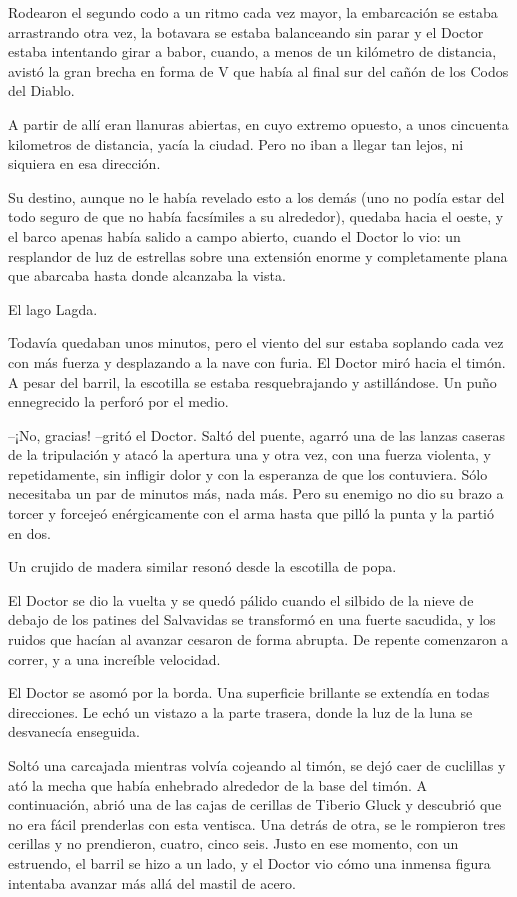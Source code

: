 Rodearon el segundo codo a un ritmo cada vez mayor, la embarcación se estaba arrastrando otra vez, la botavara se estaba balanceando sin parar y el Doctor estaba intentando girar a babor, cuando, a menos de un kilómetro de distancia, avistó la gran brecha en forma de V que había al final sur del cañón de los Codos del Diablo.
 
A partir de allí eran llanuras abiertas, en cuyo extremo opuesto, a unos cincuenta kilometros de distancia, yacía la ciudad. Pero no iban a llegar tan lejos, ni siquiera en esa dirección.
 
Su destino, aunque no le había revelado esto a los demás (uno no podía estar del todo seguro de que no había facsímiles a su alrededor), quedaba hacia el oeste, y el barco apenas había salido a campo abierto, cuando el Doctor lo vio: un resplandor de luz de estrellas sobre una extensión enorme y completamente plana que abarcaba hasta donde alcanzaba la vista.
 
El lago Lagda.
 
Todavía quedaban unos minutos, pero el viento del sur estaba soplando cada vez con más fuerza y desplazando a la nave con furia. El Doctor miró hacia el timón. A pesar del barril, la escotilla se estaba resquebrajando y astillándose. Un puño ennegrecido la perforó por el medio.
 
--¡No, gracias! --gritó el Doctor. Saltó del puente, agarró una de las lanzas caseras de la tripulación y atacó la apertura una y otra vez, con una fuerza violenta, y repetidamente, sin infligir dolor y con la esperanza de que los contuviera. Sólo necesitaba un par de minutos más, nada más. Pero su enemigo no dio su brazo a torcer y forcejeó enérgicamente con el arma hasta que pilló la punta y la partió en dos.
 
Un crujido de madera similar resonó desde la escotilla de popa.
 
El Doctor se dio la vuelta y se quedó pálido cuando el silbido de la nieve de debajo de los patines del Salvavidas se transformó en una fuerte sacudida, y los ruidos que hacían al avanzar cesaron de forma abrupta. De repente comenzaron a correr, y a una increíble velocidad.
 
El Doctor se asomó por la borda. Una superficie brillante se extendía en todas direcciones. Le echó un vistazo a la parte trasera, donde la luz de la luna se desvanecía enseguida.
 
Soltó una carcajada mientras volvía cojeando al timón, se dejó caer de cuclillas y ató la mecha que había enhebrado alrededor de la base del timón. A continuación, abrió una de las cajas de cerillas de Tiberio Gluck y descubrió que no era fácil prenderlas con esta ventisca. Una detrás de otra, se le rompieron tres cerillas y no prendieron, cuatro, cinco seis. Justo en ese momento, con un estruendo, el barril se hizo a un lado, y el Doctor vio cómo una inmensa figura intentaba avanzar más allá del mastil de acero.
 
